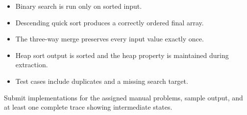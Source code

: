 \begin{verification}
\begin{itemize}
  \item Binary search is run only on sorted input.
  \item Descending quick sort produces a correctly ordered final array.
  \item The three-way merge preserves every input value exactly once.
  \item Heap sort output is sorted and the heap property is maintained during extraction.
  \item Test cases include duplicates and a missing search target.
\end{itemize}
\end{verification}

\begin{labdeliverable}
Submit implementations for the assigned manual problems, sample output, and at least one complete trace showing intermediate states.
\end{labdeliverable}
